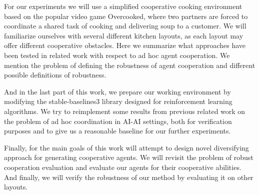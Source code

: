 For our experiments we will use a simplified cooperative cooking environment based on the popular video game Overcooked, where two partners are forced to coordinate a shared task of cooking and delivering soup to a customer.
We will familiarize ourselves with several different kitchen layouts, as each layout may offer different cooperative obstacles.
Here we summarize what approaches have been tested in related work with respect to ad hoc agent cooperation.
We mention the problem of defining the robustness of agent cooperation and different possible definitions of robustness.

And in the last part of this work, we prepare our working environment by modifying the stable-baselines3 library designed for reinforcement learning algorithms.
We try to reimplement some results from previous related work on the problem of ad hoc coordination in AI-AI settings, both for verification purposes and to give us a reasonable baseline for our further experiments.

Finally, for the main goals of this work will attempt to design novel diversifying approach for generating cooperative agents.
We will revisit the problem of robust cooperation evaluation and evaluate our agents for their cooperative abilities.
And finally, we will verify the robustness of our method by evaluating it on other layouts.

